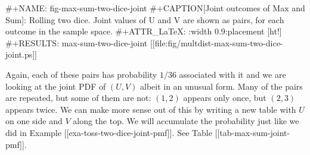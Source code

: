 #+NAME: fig-max-sum-two-dice-joint
#+CAPTION[Joint outcomes of Max and Sum]: \small Rolling two dice. Joint values of U and V are shown as pairs, for each outcome in the sample space.
#+ATTR_LaTeX: :width 0.9\textwidth :placement [ht!]
#+RESULTS: max-sum-two-dice-joint
[[file:fig/multdist-max-sum-two-dice-joint.ps]]

Again, each of these pairs has probability \(1/36\) associated with it
and we are looking at the joint PDF of \((U,V)\) albeit in an unusual
form. Many of the pairs are repeated, but some of them are not:
\((1,2)\) appears only once, but \((2,3)\) appears twice. We can make
more sense out of this by writing a new table with \(U\) on one side
and \(V\) along the top. We will accumulate the probability just like
we did in Example [[exa-toss-two-dice-joint-pmf]]. See Table [[tab-max-sum-joint-pmf]].

